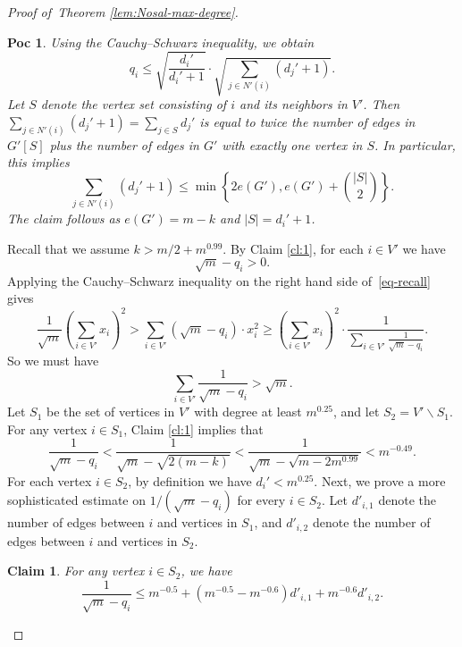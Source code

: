 \documentclass[10pt,a4paper]{amsart}
\newtheorem{claim}{Claim}
\newtheorem{poc}{Poc}
\newcommand*{\abs}[1]{\lvert#1\rvert}
\begin{document}
\begin{proof}[Proof of~Theorem \ref{lem:Nosal-max-degree}]
\begin{poc}
Using the Cauchy--Schwarz inequality, we obtain 
$$q_i \leq \sqrt{\frac{d_i'}{d_i' + 1}} \cdot \sqrt{\sum_{j \in N'(i)} (d_j' + 1)}.$$
Let $S$ denote the vertex set consisting of $i$ and its neighbors in $V'$. 
Then $\sum_{j \in N'(i)} (d_j' + 1)=\sum_{j\in S}d_j'$ is equal to twice the number of edges in $G'[S]$ plus the number of edges in $G'$ with exactly one vertex in $S$. In particular, this implies
$$\sum_{j \in N'(i)} (d_j' + 1) \leq 
\min\left\{2e(G'), e(G') + 
\binom{\abs{S}}{2}\right\}.$$
The claim follows as $e(G') = m - k$ and $\abs{S} = d_i' + 1$.  
\end{poc}

Recall that we assume $k > m/2 + m^{0.99}$. 
By Claim \ref{cl:1}, for each $i \in V'$ we have
$$\sqrt{m} - q_i > 0. $$ 
Applying the Cauchy--Schwarz inequality on the right hand side of~\eqref{eq-recall} gives 
$$\frac{1}{\sqrt{m}} \left(\sum_{i \in V'} x_i\right)^2>\sum_{i \in V'} (\sqrt{m} - q_i) \cdot x_i^2 \geq \left(\sum_{i \in V'} x_i \right)^2 \cdot \frac{1}{\sum\limits_{i \in V'} \frac{1}{\sqrt{m} - q_i}}.$$
So we must have
\begin{equation} \label{eqge-sqm}
    \sum_{i \in V'} \frac{1}{\sqrt{m} - q_i} > \sqrt{m}.
\end{equation}
Let $S_1$ be the set of vertices in $V'$ with degree at least $m^{0.25}$, and let $S_2 = V' \backslash S_1$.  
For any vertex $i \in S_1$, Claim \ref{cl:1} implies that  
\begin{equation}  \label{eq-S1} 
\frac{1}{\sqrt{m} - q_i} < \frac{1}{\sqrt{m} - \sqrt{2(m - k)}} < \frac{1}{\sqrt{m} - \sqrt{m - 2m^{0.99}}} < m^{-0.49}. 
\end{equation} 
For each vertex $i \in S_2$, by definition 
we have $d_i' < m^{0.25}$. 
Next, we prove a more sophisticated estimate 
on $1/(\sqrt{m} - q_i)$ for every $i\in S_2$. Let $d'_{i,1}$ denote the number of edges between $i$ and vertices in $S_1$, and $d'_{i,2}$ denote the number of edges between $i$ and vertices in $S_2$. 

\begin{claim}\label{cl:2}
    For any vertex $i\in S_2$, we have 
\begin{equation} \label{eq-S2}
\frac{1}{\sqrt{m} - q_i} \leq m^{-0.5} + (m^{-0.5} - m^{-0.6}) d'_{i,1} + m^{-0.6} d'_{i,2}.
\end{equation} 
\end{claim}



\end{proof}
\end{document}
